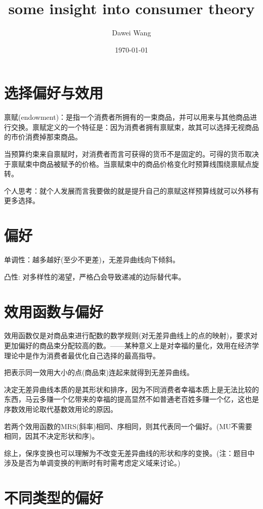\documentclass{article}
\title{some insight into consumer theory}
\author{Dawei Wang}
\date{\today}
\begin{document}
	\maketitle

\section{选择偏好与效用}

禀赋(endowment)：是指一个消费者所拥有的一束商品，并可以用来与其他商品进行交换。禀赋定义的一个特征是：因为消费者拥有禀赋束，故其可以选择无视商品的市价消费掉那束商品。

当预算约束来自禀赋时，对消费者而言可获得的货币不是固定的。可得的货币取决于禀赋束中商品被赋予的价格。当禀赋束中的商品价格变化时预算线围绕禀赋点旋转。

个人思考：就个人发展而言我要做的就是提升自己的禀赋这样预算线就可以外移有更多选择。

\section{偏好}

单调性：越多越好(至少不更差)，无差异曲线向下倾斜。

凸性: 对多样性的渴望，严格凸会导致递减的边际替代率。

\section{效用函数与偏好}

效用函数仅是对商品束进行配数的数学规则(对无差异曲线上的点的映射)，要求对更加偏好的商品束分配较高的数。——某种意义上是对幸福的量化，效用在经济学理论中是作为消费者最优化自己选择的最高指导。

把表示同一效用大小的点(商品束)连起来就得到无差异曲线。

决定无差异曲线本质的是其形状和排序，因为不同消费者幸福本质上是无法比较的东西，马云多赚一个亿带来的幸福的提高显然不如普通老百姓多赚一个亿，这也是序数效用论取代基数效用论的原因。

若两个效用函数的MRS(斜率)相同、序相同，则其代表同一个偏好。(MU不需要相同，因其不决定形状和序)。

综上，保序变换也可以理解为不改变无差异曲线的形状和序的变换。(注：题目中涉及是否为单调变换的判断时有时需考虑定义域来讨论。)

\section{不同类型的偏好}
\end{document}
